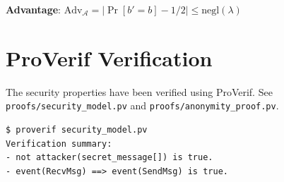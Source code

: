 \documentclass[11pt,a4paper]{article}
\begin{document}
\textbf{Advantage}: $\text{Adv}_{\mathcal{A}} = |\Pr[b' = b] - 1/2| \leq \text{negl}(\lambda)$

\section{ProVerif Verification}

The security properties have been verified using ProVerif. See \texttt{proofs/security\_model.pv} and \texttt{proofs/anonymity\_proof.pv}.

\begin{verbatim}
$ proverif security_model.pv
Verification summary:
- not attacker(secret_message[]) is true.
- event(RecvMsg) ==> event(SendMsg) is true.
\end{verbatim}
\end{document}
